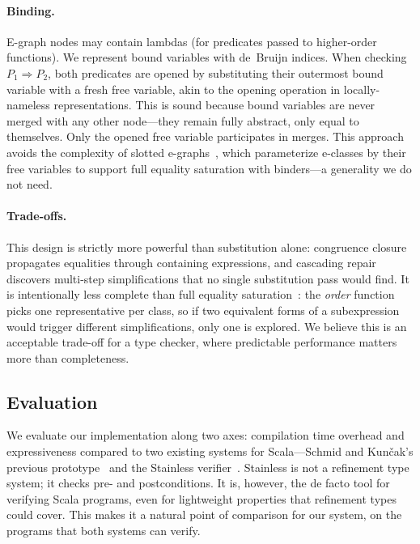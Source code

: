 \documentclass[acmsmall]{acmart}
\begin{document}
\paragraph{Binding.}
E-graph nodes may contain lambdas (for predicates passed to higher-order functions). We represent bound variables with de~Bruijn indices. When checking $P_1 \Rightarrow P_2$, both predicates are opened by substituting their outermost bound variable with a fresh free variable, akin to the opening operation in locally-nameless representations. This is sound because bound variables are never merged with any other node---they remain fully abstract, only equal to themselves. Only the opened free variable participates in merges. This approach avoids the complexity of slotted e-graphs~\cite{schneider2024}, which parameterize e-classes by their free variables to support full equality saturation with binders---a generality we do not need.

\paragraph{Trade-offs.}
This design is strictly more powerful than substitution alone: congruence closure propagates equalities through containing expressions, and cascading repair discovers multi-step simplifications that no single substitution pass would find. It is intentionally less complete than full equality saturation~\cite{willsey2021}: the \emph{order} function picks one representative per class, so if two equivalent forms of a subexpression would trigger different simplifications, only one is explored. We believe this is an acceptable trade-off for a type checker, where predictable performance matters more than completeness.

\subsection{Evaluation}\label{sec:evaluation}

We evaluate our implementation along two axes: compilation time overhead and expressiveness compared to two existing systems for Scala---Schmid and Kun\v{c}ak's previous prototype~\cite{schmid2016} and the Stainless verifier~\cite{hamza2019}. Stainless is not a refinement type system; it checks pre- and postconditions. It is, however, the de facto tool for verifying Scala programs, even for lightweight properties that refinement types could cover. This makes it a natural point of comparison for our system, on the programs that both systems can verify.
\end{document}

